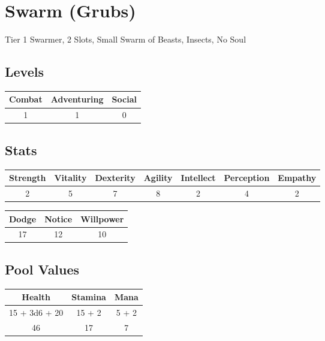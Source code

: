 \section{Swarm (Grubs)}
Tier 1 Swarmer, 2 Slots, Small Swarm of Beasts, Insects, No Soul\\

\subsection{Levels}
\begin{minipage}[H]{1\textwidth}
	\centering
	\begin{tabular}[c]{|c | c | c|}
		\hline
		Combat & Adventuring & Social\\
		\hline
		1 & 1 & 0\\
		\hline
	\end{tabular}
\end{minipage}

\subsection{Stats}
\begin{minipage}[H]{1\textwidth}
	\centering
	\begin{tabular}[c]{|c | c | c | c | c | c | c|}
		\hline
		Strength & Vitality & Dexterity & Agility & Intellect & Perception & Empathy\\
		\hline
		2 & 5 & 7 & 8 & 2 & 4 & 2\\
		\hline
	\end{tabular}
\end{minipage}
\bigbreak

\begin{minipage}[H]{1\textwidth}
	\centering
	\begin{tabular}[c]{|c | c | c|}
		\hline
		Dodge & Notice & Willpower\\
		\hline
		17 & 12 & 10\\
		\hline
	\end{tabular}
\end{minipage}

\subsection{Pool Values}
\bigbreak
\begin{minipage}[H]{1\textwidth}
	\centering
	\begin{tabular}[c]{|c | c | c|}
		\hline
		Health & Stamina & Mana\\
		\hline
		15 + 3d6 + 20 & 15 + 2 & 5 + 2 \\
		46 & 17 & 7\\
		\hline
	\end{tabular}
\end{minipage}
\noindent

